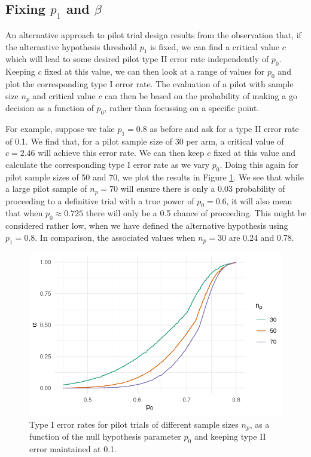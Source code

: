 \documentclass[AMA,STIX1COL]{WileyNJD-v2}
\begin{document}
\subsection{Fixing $p_1$ and $\beta$}

An alternative approach to pilot trial design results from the observation that, if the alternative hypothesis threshold $p_1$ is fixed, we can find a critical value $c$ which will lead to some desired pilot type II error rate independently of $p_0$. Keeping $c$ fixed at this value, we can then look at a range of values for $p_0$ and plot the corresponding type I error rate. The evaluation of a pilot with sample size $n_p$ and critical value $c$ can then be based on the probability of making a go decision as a function of $p_0$, rather than focussing on a specific point.

For example, suppose we take $p_1 = 0.8$ as before and ask for a type II error rate of 0.1. We find that, for a pilot sample size of 30 per arm, a critical value of  $c = 2.46$ will achieve this error rate. We can then keep $c$ fixed at this value and calculate the corresponding type I error rate as we vary $p_0$. Doing this again for pilot sample sizes of 50 and 70, we plot the results in Figure \ref{fig:alt}. We see that while a large pilot sample of $n_p = 70$ will ensure there is only a 0.03 probability of proceeding to a definitive trial with a true power of $p_0 = 0.6$, it will also mean that when $p_0 \approx 0.725$ there will only be a 0.5 chance of proceeding. This might be considered rather low, when we have defined the alternative hypothesis using $p_1 = 0.8$. In comparison, the associated values when $n_p = 30$ are 0.24 and 0.78.

\begin{figure}
\centering
\includegraphics[scale=0.8]{./Figures/alt.pdf}
\caption{Type I error rates for pilot trials of different sample sizes $n_p$, as a function of the null hypothesis parameter $p_0$ and keeping type II error maintained at 0.1.}
\label{fig:alt}
\end{figure}
\end{document}
